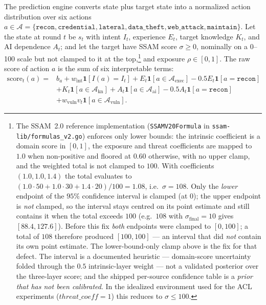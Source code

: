 \documentclass[preprints,article,accept,oneauthor]{Definitions/mdpi}
\newcommand{\act}[1]{\texttt{#1}}
\begin{document}
The prediction engine converts state plus target state into a normalized
action distribution over six actions $a \in \mathcal{A} = \{\act{recon},
\act{credential}, \act{lateral}, \act{data\_theft}, \act{web\_attack},
\act{maintain}\}$. Let the state at round $t$ be $s_t$ with intent $I_t$,
experience $E_t$, target knowledge $K_t$, and AI dependence $A_t$; and let
the target have SSAM score $\sigma \ge 0$, nominally on a 0--100 scale but
not clamped to it at the top,\footnote{The SSAM~2.0 reference implementation
(\texttt{SSAMV20Formula} in \texttt{ssam-lib/formulas\_v2.go}) enforces only
lower bounds: the intrinsic coefficient is a domain score in $[0,1]$, the
exposure and threat coefficients are mapped to $1.0$ when non-positive and
floored at $0.60$ otherwise, with no upper clamp, and the weighted total is
not clamped to $100$. With coefficients $(1.0,1.0,1.4)$ the total evaluates
to $(1.0\cdot50+1.0\cdot30+1.4\cdot20)/100=1.08$, i.e.\ $\sigma=108$. Only
the \emph{lower} endpoint of the $95\%$ confidence interval is clamped (at
$0$); the upper endpoint is \emph{not} clamped, so the interval stays centred
on its point estimate and still contains it when the total exceeds $100$
(e.g.\ $108$ with $\sigma_{\mathrm{final}}=10$ gives $[88.4,127.6]$). Before
this fix \emph{both} endpoints were clamped to $[0,100]$; a total of $108$
therefore produced $[100,100]$ --- an interval that did \emph{not} contain its
own point estimate. The lower-bound-only clamp above is the fix for that
defect. The interval is a documented heuristic --- domain-score uncertainty
folded through the $0.5$ intrinsic-layer weight --- not a validated posterior
over the three-layer score; and the shipped per-source confidence table is a
\emph{prior that has not been calibrated}.
In the idealized environment used for the ACL experiments
($\mathit{threat\_coeff}=1$) this reduces to $\sigma\le100$.}
and exposure $\rho \in [0,1]$. The raw score of action $a$ is the sum of six
interpretable terms:
\begin{equation}
\label{eq:score}
\begin{aligned}
\mathrm{score}_t(a) ={}& b_a + w_{\mathrm{int}}\mathbf{1}[I(a)=I_t]
+ E_t\mathbf{1}[a\in\mathcal{A}_{\mathrm{exec}}]
-0.5E_t\mathbf{1}[a=\act{recon}]\\
&+ K_t\mathbf{1}[a\in\mathcal{A}_{\mathrm{kn}}]
+ A_t\mathbf{1}[a\in\mathcal{A}_{\mathrm{ai}}]
-0.5A_t\mathbf{1}[a=\act{recon}]\\
&+ w_{\mathrm{vuln}}v_t\mathbf{1}[a\in\mathcal{A}_{\mathrm{vuln}}].
\end{aligned}
\end{equation}
\end{document}

